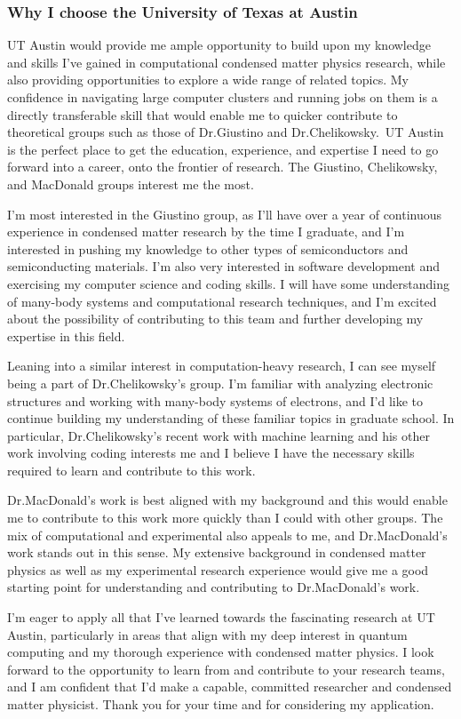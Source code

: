 \documentclass[11pt]{article}
\newcommand{\school}{University of Texas at Austin}
\newcommand{\schoolabbr}{UT Austin}
\begin{document}
\subsubsection*{Why I choose the \school{}}
\schoolabbr{} would provide me ample opportunity to build upon my knowledge and skills I've gained in computational condensed matter physics research, while also providing opportunities to explore a wide range of related topics. My confidence in navigating large computer clusters and running jobs on them is a directly transferable skill that would enable me to quicker contribute to theoretical groups such as those of Dr.\@ Giustino and Dr.\@ Chelikowsky.\ \schoolabbr{} is the perfect place to get the education, experience, and expertise I need to go forward into a career, onto the frontier of research. The Giustino, Chelikowsky, and MacDonald groups interest me the most.

I'm most interested in the Giustino group, as I'll have over a year of continuous experience in condensed matter research by the time I graduate, and I'm interested in pushing my knowledge to other types of semiconductors and semiconducting materials. I'm also very interested in software development and exercising my computer science and coding skills. I will have some understanding of many-body systems and computational research techniques, and I'm excited about the possibility of contributing to this team and further developing my expertise in this field.

Leaning into a similar interest in computation-heavy research, I can see myself being a part of Dr.\@ Chelikowsky's group. I'm familiar with analyzing electronic structures and working with many-body systems of electrons, and I'd like to continue building my understanding of these familiar topics in graduate school. In particular, Dr.\@ Chelikowsky's recent work with machine learning and his other work involving coding interests me and I believe I have the necessary skills required to learn and contribute to this work.

Dr.\@ MacDonald's work is best aligned with my background and this would enable me to contribute to this work more quickly than I could with other groups. The mix of computational and experimental also appeals to me, and Dr.\@ MacDonald's work stands out in this sense. My extensive background in condensed matter physics as well as my experimental research experience would give me a good starting point for understanding and contributing to Dr.\@ MacDonald's work.

I'm eager to apply all that I've learned towards the fascinating research at \schoolabbr{}, particularly in areas that align with my deep interest in quantum computing and my thorough experience with condensed matter physics. I look forward to the opportunity to learn from and contribute to your research teams, and I am confident that I'd make a capable, committed researcher and condensed matter physicist. Thank you for your time and for considering my application.
\end{document}
